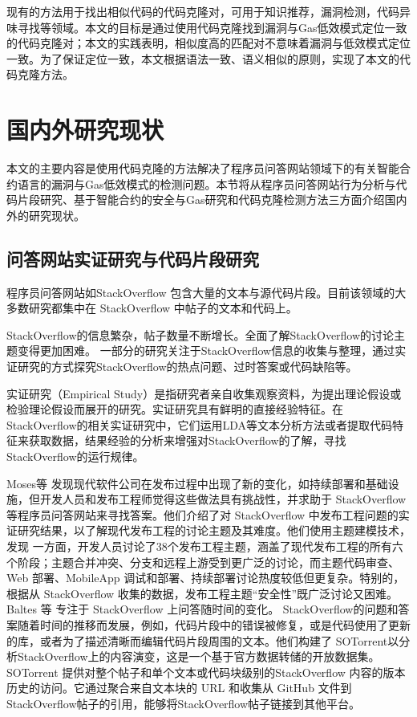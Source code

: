 现有的方法用于找出相似代码的代码克隆对，可用于知识推荐，漏洞检测，代码异味寻找等领域。本文的目标是通过使用代码克隆找到漏洞与Gas低效模式定位一致的代码克隆对；本文的实践表明，相似度高的匹配对不意味着漏洞与低效模式定位一致。为了保证定位一致，本文根据语法一致、语义相似的原则，实现了本文的代码克隆方法。

\section{国内外研究现状}

本文的主要内容是使用代码克隆的方法解决了程序员问答网站领域下的有关智能合约语言的漏洞与Gas低效模式的检测问题。本节将从程序员问答网站行为分析与代码片段研究、基于智能合约的安全与Gas研究和代码克隆检测方法三方面介绍国内外的研究现状。

\subsection{问答网站实证研究与代码片段研究}

程序员问答网站如StackOverflow 包含大量的文本与源代码片段。目前该领域的大多数研究都集中在 StackOverflow 中帖子的文本和代码上。

StackOverflow的信息繁杂，帖子数量不断增长。全面了解StackOverflow的讨论主题变得更加困难。
一部分的研究关注于StackOverflow信息的收集与整理，通过实证研究的方式探究StackOverflow的热点问题、过时答案或代码缺陷等。

实证研究（Empirical Study）是指研究者亲自收集观察资料，为提出理论假设或检验理论假设而展开的研究。实证研究具有鲜明的直接经验特征。在StackOverflow的相关实证研究中，它们运用LDA等文本分析方法或者提取代码特征来获取数据，结果经验的分析来增强对StackOverflow的了解，寻找StackOverflow的运行规律。

Moses等\cite{analysis_modern} 发现现代软件公司在发布过程中出现了新的变化，如持续部署和基础设施，但开发人员和发布工程师觉得这些做法具有挑战性，并求助于 StackOverflow 等程序员问答网站来寻找答案。他们介绍了对 StackOverflow 中发布工程问题的实证研究结果，以了解现代发布工程的讨论主题及其难度。他们使用主题建模技术，发现 一方面，开发人员讨论了38个发布工程主题，涵盖了现代发布工程的所有六个阶段；主题合并冲突、分支和远程上游受到更广泛的讨论，而主题代码审查、Web 部署、MobileApp 调试和部署、持续部署讨论热度较低但更复杂。特别的，根据从 StackOverflow 收集的数据，发布工程主题“安全性”既广泛讨论又困难。
Baltes 等 \cite{so_torrent} 专注于 StackOverflow 上问答随时间的变化。  StackOverflow的问题和答案随着时间的推移而发展，例如，代码片段中的错误被修复，或是代码使用了更新的库，或者为了描述清晰而编辑代码片段周围的文本。他们构建了 SOTorrent以分析StackOverflow上的内容演变，这是一个基于官方数据转储的开放数据集。 SOTorrent 提供对整个帖子和单个文本或代码块级别的StackOverflow 内容的版本历史的访问。它通过聚合来自文本块的 URL 和收集从 GitHub 文件到StackOverflow帖子的引用，能够将StackOverflow帖子链接到其他平台。

